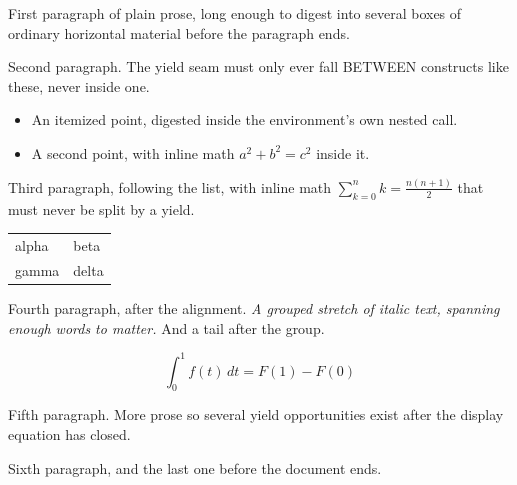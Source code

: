 \documentclass{article}
\begin{document}
First paragraph of plain prose, long enough to digest into several boxes of
ordinary horizontal material before the paragraph ends.

Second paragraph. The yield seam must only ever fall BETWEEN constructs like
these, never inside one.

\begin{itemize}
\item An itemized point, digested inside the environment's own nested call.
\item A second point, with inline math $a^2+b^2=c^2$ inside it.
\end{itemize}

Third paragraph, following the list, with inline math $\sum_{k=0}^n k =
\frac{n(n+1)}{2}$ that must never be split by a yield.

\begin{tabular}{ll}
alpha & beta \\
gamma & delta \\
\end{tabular}

Fourth paragraph, after the alignment. {\itshape A grouped stretch of italic
text, spanning enough words to matter.} And a tail after the group.

\begin{equation}
\int_0^1 f(t)\,dt = F(1) - F(0)
\end{equation}

Fifth paragraph. More prose so several yield opportunities exist after the
display equation has closed.

Sixth paragraph, and the last one before the document ends.
\end{document}
